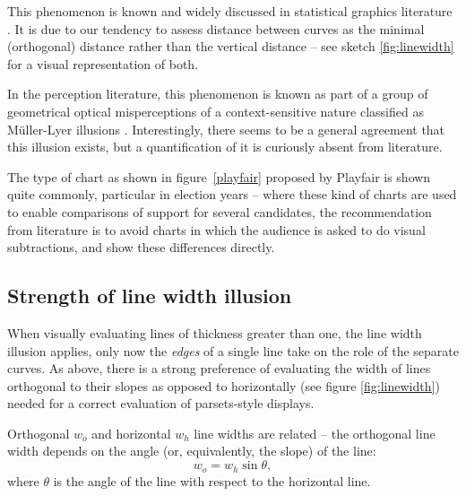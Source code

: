This phenomenon  is known and widely discussed in statistical graphics literature \cite{cleveland:1984, tufte, wainer:2000, robbins:2005}. It  is due to our  tendency to assess distance between curves as the minimal (orthogonal) distance rather than the  vertical distance -- see sketch \ref{fig:linewidth} for a visual representation of both.


In the perception literature, this phenomenon is known as part of a group of geometrical optical misperceptions of a context-sensitive nature classified as M\"uller-Lyer illusions \cite{day:1991}. Interestingly, there seems to be a general agreement that this illusion exists, but a quantification of it is curiously absent from literature. 

The type of chart as shown in figure~\ref{playfair} proposed by Playfair is shown quite commonly, particular in election years -- where these kind of charts are used to enable comparisons of support for several candidates, the recommendation from literature is to avoid charts in which the audience is asked to do visual subtractions, and show these differences directly.

\subsection{Strength of  line width illusion}\label{distortion}

When visually evaluating lines of thickness greater than one, the line width illusion applies, only now the {\it edges} of a single line  take on the role of the separate curves. %
As above, there is a strong preference of evaluating the width of lines orthogonal to their slopes as opposed to horizontally (see figure \ref{fig:linewidth})  needed for a correct  evaluation of parsets-style displays.

Orthogonal $w_o$ and horizontal $w_h$ line widths are related -- the orthogonal line width depends on the angle (or, equivalently, the slope) of the line:
\begin{equation}\label{adjust}
w_o = w_h \sin \theta,
\end{equation}
where $\theta$ is the angle of the line with respect to the horizontal line.

